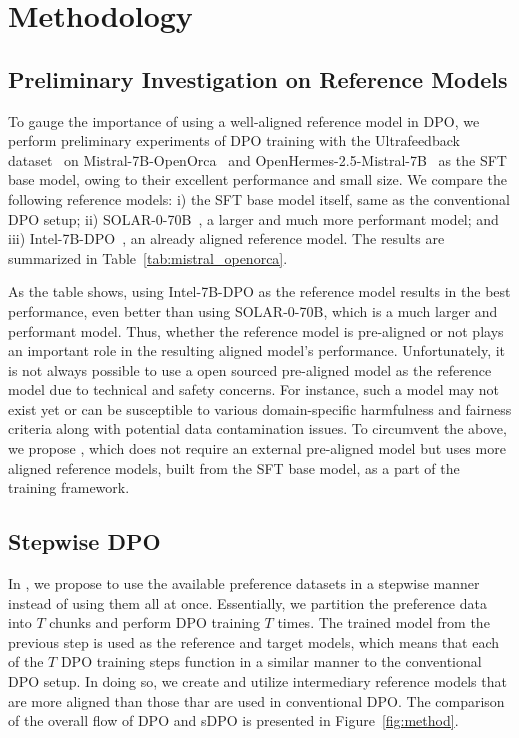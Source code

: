 \section{Methodology}

\subsection{Preliminary Investigation on Reference Models}
To gauge the importance of using a well-aligned reference model in DPO, we perform preliminary experiments of DPO training with the Ultrafeedback dataset~\cite{cui2023ultrafeedback} on Mistral-7B-OpenOrca~\cite{lian2023mistralorca1} and OpenHermes-2.5-Mistral-7B~\cite{openhermes} as the SFT base model, owing to their excellent performance and small size. We compare the following reference models: i) the SFT base model itself, same as the conventional DPO setup; ii) SOLAR-0-70B~\cite{solar70}, a larger and much more performant model; and iii) Intel-7B-DPO~\cite{intel7b}, an already aligned reference model. The results are summarized in Table~\ref{tab:mistral_openorca}.

As the table shows, using Intel-7B-DPO as the reference model results in the best performance, even better than using SOLAR-0-70B, which is a much larger and performant model.
Thus, whether the reference model is pre-aligned or not plays an important role in the resulting aligned model's performance.
Unfortunately, it is not always possible to use a open sourced pre-aligned model as the reference model due to technical and safety concerns. For instance, such a model may not exist yet or can be susceptible to various domain-specific harmfulness and fairness criteria along with potential data contamination issues.
To circumvent the above, we propose \method, which does not require an external pre-aligned model but uses more aligned reference models, built from the SFT base model, as a part of the training framework.

\subsection{Stepwise DPO}
\label{sec:sdpo}
In \method, we propose to use the available preference datasets in a stepwise manner instead of using them all at once.
Essentially, we partition the preference data into $T$ chunks and perform DPO training $T$ times.
The trained model from the previous step is used as the reference and target models, which means that each of the $T$ DPO training steps function in a similar manner to the conventional DPO setup.
In doing so, we create and utilize intermediary reference models that are more aligned than those thar are used in conventional DPO.
The comparison of the overall flow of DPO and sDPO is presented in Figure~\ref{fig:method}.
